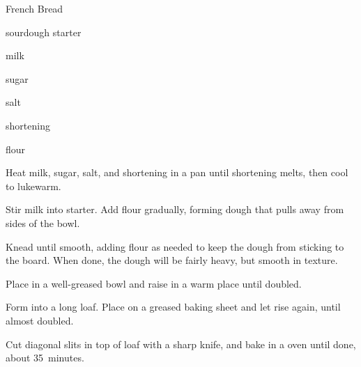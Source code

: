 \begin{recipe}{French Bread}{}{}

\begin{ingredients}
\item {} sourdough starter
\item \C{\half} milk
\item \Tp{1\eight} sugar
\item \tp{2\quarter} salt
\item \C{\eight} shortening 
\item \C{1\twothird} flour
\end{ingredients}

\begin{directions}

\item Heat milk, sugar, salt, and shortening in a pan until shortening melts, then cool to lukewarm.

\item Stir milk into starter. Add flour gradually, forming dough that pulls away from sides of the bowl.

\item Knead until smooth, adding flour as needed to keep the dough from sticking to the board. When done, the dough will be fairly heavy, but smooth in texture.

\item Place in a well-greased bowl and raise in a warm place until doubled.

\item Form into a long loaf. Place on a greased baking sheet and let rise again, until almost doubled.

\item Cut diagonal slits in top of loaf with a sharp knife, and bake in a  oven until done, about 35~minutes.

\end{directions}
\end{recipe}
